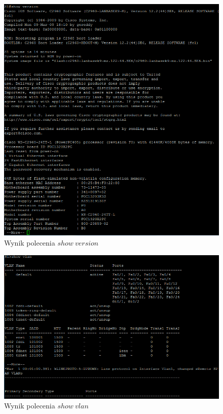 \documentclass[wide,a4paper,titlepage,12pt] {article}
\begin{document}
  \begin{figure}[htbp]
    \begin{center}
      \includegraphics[width=\textwidth]{img/t3.PNG}
      \caption{Wynik polecenia $show\ version$}
    \end{center}
  \end{figure}

  \begin{figure}[htbp]
    \begin{center}
      \includegraphics[width=\textwidth]{img/t4.PNG}
      \caption{Wynik polecenia $show\ vlan$}
    \end{center}
  \end{figure}
\end{document}
